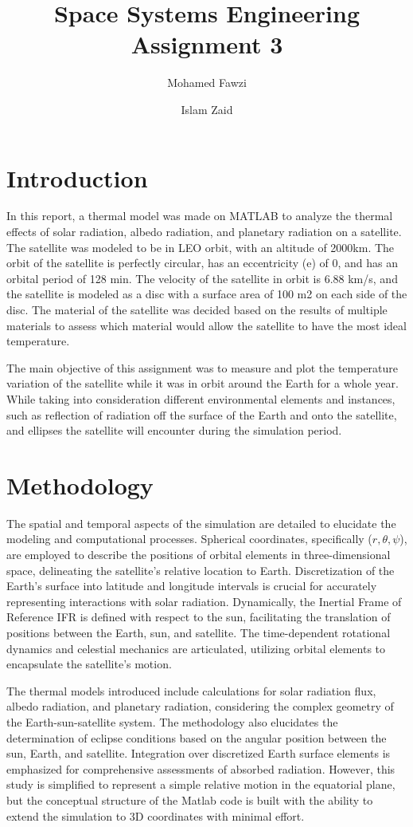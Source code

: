 \documentclass[11pt]{article}
\title{Space Systems Engineering Assignment 3}
\author[1]{Mohamed Fawzi}
\author[2]{Islam Zaid}
\affil[1]{Aerospace Department, Khalifa University\\100064444@ku.ac.ae}
\affil[2]{Aerospace Department, Khalifa University\\islam.zaid@ku.ac.ae}
\date{}
\begin{document}
\maketitle


\section{Introduction} 
\indent In this report, a thermal model was made on MATLAB to analyze the thermal effects of solar radiation, albedo radiation, and planetary radiation on a satellite. The satellite was modeled to be in LEO orbit, with an altitude of 2000km. The orbit of the satellite is perfectly circular, has an eccentricity (e) of 0, and has an orbital period of 128 min. The velocity of the satellite in orbit is 6.88 km/s, and the satellite is modeled as a disc with a surface area of 100 m2 on each side of the disc. The material of the satellite was decided based on the results of multiple materials to assess which material would allow the satellite to have the most ideal temperature.

\indent The main objective of this assignment was to measure and plot the temperature variation of the satellite while it was in orbit around the Earth for a whole year. While taking into consideration different environmental elements and instances, such as reflection of radiation off the surface of the Earth and onto the satellite, and ellipses the satellite will encounter during the simulation period.


\section{Methodology}   
\indent The spatial and temporal aspects of the simulation are detailed to elucidate the modeling and computational processes. Spherical coordinates, specifically ($r,\theta,\psi$), are employed to describe the positions of orbital elements in three-dimensional space, delineating the satellite’s relative location to Earth. Discretization of the Earth’s surface into latitude and longitude intervals is crucial for accurately representing interactions with solar radiation. Dynamically, the Inertial Frame of Reference \ac{IFR} is defined with respect to the sun, facilitating the translation of positions between the Earth, sun, and satellite. The time-dependent rotational dynamics and celestial mechanics are articulated, utilizing orbital elements to encapsulate the satellite’s motion.

\indent The thermal models introduced include calculations for solar radiation flux, albedo radiation, and planetary radiation, considering the complex geometry of the Earth-sun-satellite system. The methodology also elucidates the determination of eclipse conditions based on the angular position between the sun, Earth, and satellite. Integration over discretized Earth surface elements is emphasized for comprehensive assessments of absorbed radiation. However, this study is simplified to represent a simple relative motion in the equatorial plane, but the conceptual structure of the Matlab code is built with the ability to extend the simulation to 3D coordinates with minimal effort.
\end{document}
